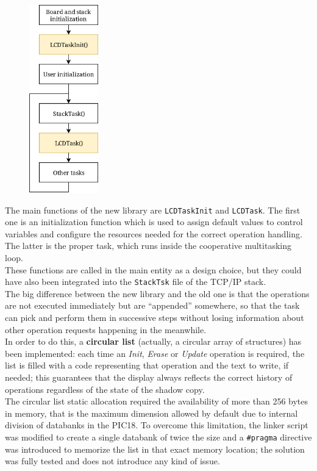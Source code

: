 \begin{figure}
	\includegraphics[width=3cm]{images/taskmgmt}
	\label{fig:taskmgmt}
\end{figure}

The main functions of the new library are \texttt{LCDTaskInit} and \texttt{LCDTask}. The first one is an initialization function which is used to assign default values to control variables and configure the resources needed for the correct operation handling. The latter is the proper task, which runs inside the cooperative multitasking loop.\\
These functions are called in the main entity as a design choice, but they could have also been integrated into the \texttt{StackTsk} file of the TCP/IP stack.\\

The big difference between the new library and the old one is that the operations are not executed immediately but are ``appended'' somewhere, so that the task can pick and perform them in successive steps without losing information about other operation requests happening in the meanwhile.\\
In order to do this, a \textbf{circular list} (actually, a circular array of structures) has been implemented: each time an \textit{Init}, \textit{Erase} or \textit{Update} operation is required, the list is filled with a code representing that operation and the text to write, if needed; this guarantees that the display always reflects the correct history of operations regardless of the state of the shadow copy.\\
The circular list static allocation required the availability of more than 256 bytes in memory, that is the maximum dimension allowed by default due to internal division of databanks in the PIC18. To overcome this limitation, the linker script was modified to create a single databank of twice the size and a \texttt{\#pragma} directive was introduced to memorize the list in that exact memory location; the solution was fully tested and does not introduce any kind of issue.\\


